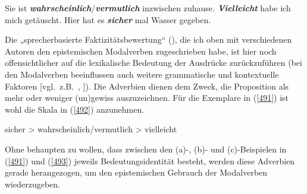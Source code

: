 \begin{exe}
	\ex\label{491} 
		\begin{xlist}	
			\ex\label{491a} Sie ist \textit{\textbf{wahrscheinlich}}/\textit{\textbf{vermutlich}} inzwischen zuhause.
			\newline
			\hbox{}\hfill\hbox{\citet[29]{Diewald1997}}
			\ex\label{491b} \textit{\textbf{Vielleicht}} habe ich mich getäuscht.	
			\hfill\hbox{\citet[278]{Diewald1999b}}
			\ex\label{491c} Hier hat es \textit{\textbf{sicher}} mal Wasser gegeben.
			\hfill\hbox{\citet[67]{Dietrich1992}}			
		\end{xlist}
\end{exe}
Die „sprecherbasierte Faktizitätsbewertung“ (\citealt[14]{Diewald1999b}), die ich oben mit verschiedenen Autoren den epistemischen Modalverben zugeschrieben habe, ist hier noch offensichtlicher auf die lexikalische Bedeutung der Ausdrücke zurückzuführen (bei den Modalverben beeinflussen auch weitere grammatische und kontextuelle Faktoren [vgl.\ z.B.\ \citealt[223--229]{Diewald1993}, \citealt[23--33]{Heine1995}]). Die Adverbien dienen dem Zweck, die Proposition als mehr oder weniger (un)gewiss auszuzeichnen. Für die Exemplare in (\ref{491}) ist wohl die Skala in (\ref{492}) anzunehmen.

\begin{exe}
	\ex\label{492} 
	sicher > wahrscheinlich/vermutlich > vielleicht
\end{exe}
Ohne behaupten zu wollen, dass zwischen den (a)-, (b)- und (c)-Beispielen in (\ref{491}) und (\ref{493}) jeweils Bedeutungsidentität besteht, werden diese Adverbien gerade herangezogen, um den epistemischen Gebrauch der Modalverben wiederzugeben.

